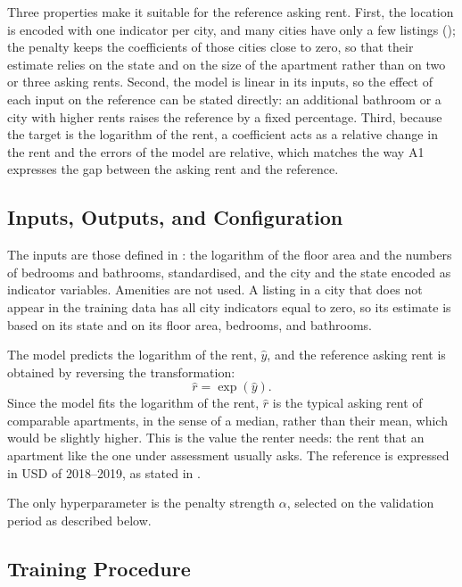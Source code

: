 \documentclass[12pt,a4paper]{report}
\begin{document}
Three properties make it suitable for the reference asking rent. First, the
location is encoded with one indicator per city, and many cities have only a
few listings (); the penalty keeps the coefficients
of those cities close to zero, so that their estimate relies on the state
and on the size of the apartment rather than on two or three asking rents.
Second, the model is linear in its inputs, so the effect of each input on
the reference can be stated directly: an additional bathroom or a city with
higher rents raises the reference by a fixed percentage. Third, because the
target is the logarithm of the rent, a coefficient acts as a relative change
in the rent and the errors of the model are relative, which matches the way
A1 expresses the gap between the asking rent and the reference.

\subsection{Inputs, Outputs, and Configuration}

The inputs are those defined in : the logarithm
of the floor area and the numbers of bedrooms and bathrooms, standardised,
and the city and the state encoded as indicator variables. Amenities are not
used. A listing in a city that does not appear in the training data has all
city indicators equal to zero, so its estimate is based on its state and on
its floor area, bedrooms, and bathrooms.

The model predicts the logarithm of the rent, $\hat{y}$, and the reference
asking rent is obtained by reversing the transformation:
\begin{equation}
  \hat{r} = \exp(\hat{y}).
  \label{eq:reference}
\end{equation}
Since the model fits the logarithm of the rent, $\hat{r}$ is the typical
asking rent of comparable apartments, in the sense of a median, rather than
their mean, which would be slightly higher. This is the value the renter
needs: the rent that an apartment like the one under assessment usually
asks. The reference is expressed in USD of 2018--2019, as stated in
.

The only hyperparameter is the penalty strength $\alpha$, selected on the
validation period as described below.

\subsection{Training Procedure}
\label{sec:training-procedure}
\end{document}
